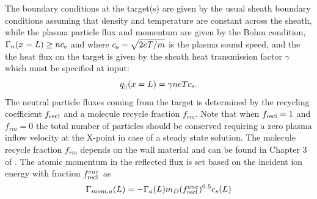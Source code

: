 \documentclass[amsmath,amssymb,a4]{revtex4-2}
\begin{document}
The boundary conditions at the target(s) are given by the usual sheath boundary conditions assuming that density and temperature are constant across the sheath, while the plasma particle flux and momentum are given by the Bohm condition, $\Gamma_n(x=L) \ge n c_{\rm s}$ and  where $c_{\rm s} = \sqrt{2eT/m}$ is the plasma sound speed, and the the heat flux on the target is given by the sheath heat transmission factor $\gamma$ which must be specified at input:
\begin{equation}\label{sheath_heat_transmission}
    q_\parallel(x=L) = \gamma n e T c_{\rm s}.
\end{equation}
The neutral particle fluxes coming from the target is determined by the recycling coefficient $f_{\rm recl}$ and a molecule recycle fraction $f_{rm}$.
Note that when $f_{\rm recl}=1$ and $f_{rm}=0$ the total number of particles should be conserved requiring a zero plasma inflow velocity at the X-point in case of a steady state solution. The molecule recycle fraction $f_{rm}$ depends on the wall material and can be found in Chapter 3 of \cite{stangeby}.  
The atomic momentum in the reflected flux is set based on the incident ion energy with fraction $f_{\rm recl}^{ene}$ as 
\begin{equation}  
\Gamma_{mom,a}(L)= - \Gamma_a(L) m_{D} (f_{\rm recl}^{ene})^{0.5} c_{s}(L)
\end{equation}
\end{document}
